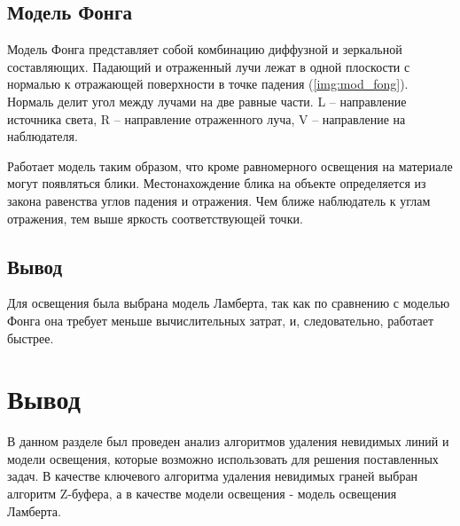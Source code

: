 \subsection{Модель Фонга}

Модель Фонга \cite{lamber_fong} представляет собой комбинацию диффузной и зеркальной составляющих. Падающий и отраженный лучи лежат в одной плоскости с
нормалью к отражающей поверхности в точке падения (\ref{img:mod_fong}). Нормаль
делит угол между лучами на две равные части. L – направление источника света, R – направление отраженного луча, V – направление на наблюдателя.


Работает модель таким образом, что кроме равномерного освещения на материале могут появляться блики. Местонахождение блика на объекте определяется из закона равенства углов падения и отражения. Чем ближе
наблюдатель к углам отражения, тем выше яркость соответствующей точки.

\subsection*{Вывод}
Для освещения была выбрана модель Ламберта, так как по сравнению с моделью Фонга она требует меньше вычислительных затрат, и, следовательно,
работает быстрее.

\section*{Вывод}
В данном разделе был проведен анализ алгоритмов удаления невидимых линий и модели освещения, которые возможно использовать для решения поставленных задач. В качестве ключевого алгоритма удаления невидимых граней выбран алгоритм Z-буфера, а в качестве модели освещения - модель освещения Ламберта. 

